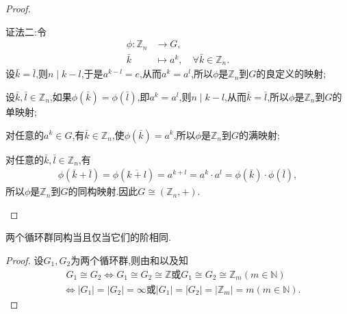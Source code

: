 \documentclass[../../main.tex]{subfiles}%
\begin{document}
\begin{proof}
\begin{enumerate}[(1)]
\begin{enumerate}[(i)]
{\color{blue}证法二:}令
\begin{align*}
\phi: \mathbb{Z}_n &\to G, \\
\bar{k} &\mapsto a^k,\quad \forall \bar{k} \in \mathbb{Z}_n.
\end{align*}
设$\bar{k} = \bar{l}$,则$n \mid k - l$,于是$a^{k-l} = e$,从而$a^k = a^l$,所以$\phi$是$\mathbb{Z}_n$到$G$的良定义的映射;

设$\bar{k},\bar{l} \in \mathbb{Z}_n$,如果$\phi(\bar{k}) = \phi(\bar{l})$,即$a^k = a^l$,则$n \mid k - l$,从而$\bar{k} = \bar{l}$,所以$\phi$是$\mathbb{Z}_n$到$G$的单映射;

对任意的$a^k \in G$,有$\bar{k} \in \mathbb{Z}_n$,使$\phi(\bar{k}) = a^k$,所以$\phi$是$\mathbb{Z}_n$到$G$的满映射;

对任意的$\bar{k},\bar{l} \in \mathbb{Z}_n$,有
\begin{align*}
\phi(\bar{k} + \bar{l}) = \phi(\overline{k + l}) = a^{k+l} = a^k \cdot a^l = \phi(\bar{k}) \cdot \phi(\bar{l}),
\end{align*}
所以$\phi$是$\mathbb{Z}_n$到$G$的同构映射.因此$G \cong (\mathbb{Z}_n,+)$.
\end{enumerate}
\end{enumerate}
\end{proof}

\begin{corollary}
两个循环群同构当且仅当它们的阶相同.
\end{corollary}
\begin{proof}
设$G_1,G_2$为两个循环群,则由和以及知
\begin{align*}
&\,\,G_1\cong G_2\iff G_1\cong G_2\cong \mathbb{Z}\text{或}G_1\cong G_2\cong \mathbb{Z}_m(m\in \mathbb{N})\\
&\iff |G_1|=|G_2|=\infty\text{或}|G_1|=|G_2|=|\mathbb{Z}_m|=m(m\in \mathbb{N}).
\end{align*}
\end{proof}
\end{document}

